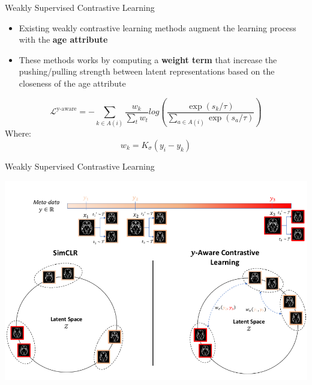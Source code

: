 \documentclass[12pt,aspectratio=169]{beamer}
\begin{document}
\begin{frame}{Weakly Supervised Contrastive Learning}
\begin{itemize}
    \item Existing weakly contrastive learning methods augment the learning
    process with the \textbf{age attribute}
    \item These methods works by computing a \textbf{weight term} that increase
    the pushing/pulling strength between latent representations based on the
    closeness of the age attribute
\end{itemize}
\begin{equation*}
    \mathcal{L}^{\text{y-aware}} = 
    -\sum_{k \in A(i)} \frac{w_k}{\sum_t w_t} log
    \left(
    \frac
    {\exp(s_k / \tau)}
    {\sum\limits_{a \in A(i)} \exp(s_a / \tau)}
    \right)
\end{equation*}
Where:
\begin{equation*}
    w_k = K_\sigma(y_i - y_k)
\end{equation*}
\end{frame}

\begin{frame}{Weakly Supervised Contrastive Learning}
\begin{center}
    \includegraphics[width=.7\textwidth]{source/yaware.png}\\
\end{center}
\end{frame}
\end{document}
